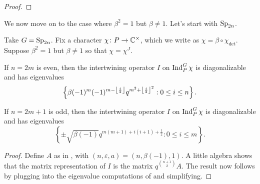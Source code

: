 \begin{proof}
\end{proof}
We now move on to the case where $\beta^2=1$ but $\beta\ne1$. Let's start with $\mathrm{Sp}_{2n}$.
\begin{theorem} \label{thm:sp-quadratic-eigens}
    Take $G=\mathrm{Sp}_{2n}$. Fix a character $\chi\colon P\to\mathbb C^\times$, which we write as $\chi=\beta\circ\chi_{\det}$. Suppose $\beta^2=1$ but $\beta\ne1$ so that $\chi=\chi^J$.
    \begin{listalph}
        \item If $n=2m$ is even, then the intertwining operator $I$ on $\operatorname{Ind}_P^G\chi$ is diagonalizable and has eigenvalues
        \[\left\{\beta(-1)^m(-1)^{m-\left\lfloor{\frac i2}\right\rfloor}q^{m^2+\left\lfloor{\frac{i}2}\right\rfloor^2}:0\le i\le n\right\}.\]
        \item If $n=2m+1$ is odd, then the intertwining operator $I$ on $\operatorname{Ind}_P^G\chi$ is diagonalizable and has eigenvalues
        \[\left\{\pm\sqrt{\beta(-1)}q^{m(m+1)+i(i+1)+\frac12}:0\le i\le m\right\}.\]
    \end{listalph}
\end{theorem}
\begin{proof}
    Define $A$ as in , with $(n,\varepsilon,a)=(n,\beta(-1),1)$. A little algebra shows that the matrix representation of $I$ is the matrix $q^{\binom{n+1}2}A$. The result now follows by plugging into the eigenvalue computations of  and simplifying.
\end{proof}
